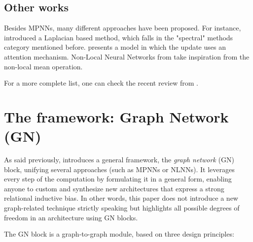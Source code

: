 \documentclass{article}
\begin{document}
    \subsection{Other works}
    \label{subsec:other-works}

Besides MPNNs, many different approaches have been proposed. For instance, \cite[Kipf et al. 2016]{kipf2016semisupervised} introduced a Laplacian based method, which falls in the "spectral" methods category mentioned before. \cite[Veličković et al. 2017]{velikovi2017graphattention} presents a model in which the update uses an attention mechanism. Non-Local Neural Networks from \cite[Wang et al. 2017]{wang2017nonlocal} take inspiration from the non-local mean operation.

For a more complete list, one can check the recent review from \cite[Wu et al. 2019]{wu2019comprehensive}.

\section{The framework: Graph Network (GN)}
\label{sec:framework}

As said previously, \cite[Battaglia et al. 2018]{battaglia2018relational} introduces a general framework, the \emph{graph network} (GN) block, unifying several approaches (such as MPNNs or NLNNs). It leverages every step of the computation by formulating it in a general form, enabling anyone to custom and synthesize new architectures that express a strong relational inductive bias. In other words, this paper does not introduce a new graph-related technique strictly speaking but highlights all possible degrees of freedom in an architecture using GN blocks.

The GN block is a graph-to-graph module, based on three design principles:
\end{document}
